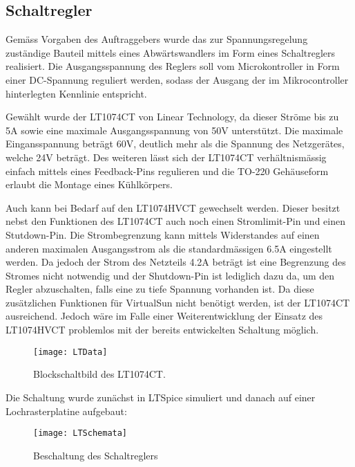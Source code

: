 %
%

\subsection{Schaltregler}\label{schaltregler}

Gemäss Vorgaben des Auftraggebers wurde das zur Spannungsregelung zuständige Bauteil mittels eines Abwärtswandlers im Form eines Schaltreglers realisiert. Die Ausgangsspannung des Reglers soll vom Microkontroller in Form einer DC-Spannung reguliert werden, sodass der Ausgang der im Mikrocontroller hinterlegten Kennlinie entspricht. 

Gewählt wurde der LT1074CT von Linear Technology, da dieser Ströme bis zu 5A sowie eine maximale Ausgangsspannung von 50V unterstützt. Die maximale Eingansspannung beträgt 60V, deutlich mehr als die Spannung des Netzgerätes, welche 24V beträgt.
Des weiteren lässt sich der LT1074CT verhältnismässig einfach mittels eines Feedback-Pins regulieren und die TO-220 Gehäuseform erlaubt die Montage eines Kühlkörpers.

Auch kann bei Bedarf auf den LT1074HVCT gewechselt werden. Dieser besitzt nebst den Funktionen des LT1074CT auch noch einen Stromlimit-Pin und einen Stutdown-Pin. Die Strombegrenzung kann mittels Widerstandes auf einen anderen maximalen Ausgangsstrom als die standardmässigen 6.5A eingestellt werden. Da jedoch der Strom des Netzteils 4.2A beträgt ist eine Begrenzung des Stromes nicht notwendig und  der Shutdown-Pin ist lediglich dazu da, um den Regler abzuschalten, falls eine zu tiefe Spannung vorhanden ist. Da diese zusätzlichen Funktionen für VirtualSun nicht benötigt werden, ist der LT1074CT ausreichend. Jedoch wäre im Falle einer Weiterentwicklung der Einsatz des LT1074HVCT problemlos mit der bereits entwickelten Schaltung möglich.

\begin{figure}[h]
\centering
\texttt{[image: LTData]}%
\caption{Blockschaltbild des LT1074CT.}
\label{fig::LTData}
\end{figure}

Die Schaltung wurde zunächst in LTSpice simuliert und danach auf einer Lochrasterplatine aufgebaut:

\begin{figure}[h]
\centering
\texttt{[image: LTSchemata]}%
\caption{Beschaltung des Schaltreglers}%
\label{fig::LTSchemata}%
\end{figure}

